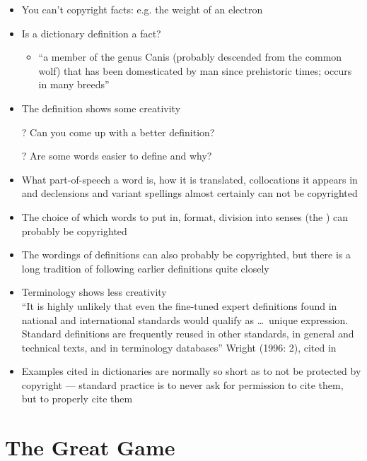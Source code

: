 \documentclass[a4paper,landscape,headrule,footrule,xetex]{foils}
\begin{document}
\begin{itemize}
\item You can't copyright facts: e.g. the weight of an electron
\item Is a dictionary definition a fact?
  \begin{itemize}
  \item {} ``a member of the genus Canis (probably descended
    from the common wolf) that has been domesticated by man since
    prehistoric times; occurs in many breeds''
  \end{itemize}
\item The definition shows some creativity
\item[?] Can you come up with a better definition? \task 
\item[?] Are some words easier to define and why? \task 


\newpage
\item What part-of-speech a word is, how it is translated,
  collocations it appears in and declensions and variant spellings 
  almost certainly can not be copyrighted

\item The choice of which words to put in, format, division into senses (the ) can probably be copyrighted
\item The wordings of definitions can also probably be copyrighted,
  but there is a long tradition of following earlier definitions quite closely
\item Terminology shows less creativity
\\
``It is highly unlikely that even the fine-tuned expert
  definitions found in national and international standards would
  qualify as \ldots\ unique expression.  Standard definitions are
  frequently reused in other standards, in general and technical
  texts, and in terminology databases'' Wright (1996: 2), cited in
  \citet{Alberts:Jooste:2012}
\item Examples cited in dictionaries are normally so short as to not
  be protected by copyright --- standard practice is to never ask for permission to cite them, but to properly cite them \citep{Landau:1989}
\end{itemize}

\section{The Great Game}
\end{document}
